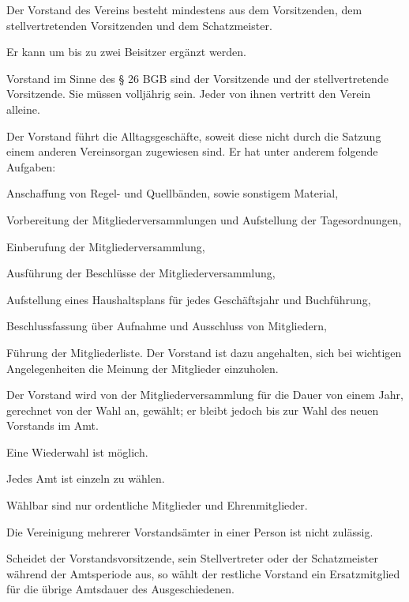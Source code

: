 \begin{contract}
	
 Der Vorstand des Vereins besteht mindestens aus dem Vorsitzenden, dem stellvertretenden Vorsitzenden und dem Schatzmeister.

	Er kann um bis zu zwei Beisitzer ergänzt werden.
	
	 Vorstand im Sinne des § 26 BGB sind der Vorsitzende und der stellvertretende Vorsitzende. Sie müssen volljährig sein. Jeder von ihnen vertritt den Verein alleine.

	
Der Vorstand führt die Alltagsgeschäfte, soweit diese nicht durch die Satzung einem anderen Vereinsorgan zugewiesen sind. Er hat unter anderem folgende Aufgaben:
	\begin{subpara}
		\item Anschaffung von Regel- und Quellbänden, sowie sonstigem Material,
		\item Vorbereitung der Mitgliederversammlungen und Aufstellung der Tagesordnungen,
		\item Einberufung der Mitgliederversammlung,
		\item Ausführung der Beschlüsse der Mitgliederversammlung,
		\item Aufstellung eines Haushaltsplans für jedes Geschäftsjahr und Buchführung,
		\item Beschlussfassung über Aufnahme und Ausschluss von Mitgliedern,
		\item Führung der Mitgliederliste.
		Der Vorstand ist dazu angehalten, sich bei wichtigen Angelegenheiten die Meinung der Mitglieder einzuholen.
	\end{subpara}

	
 Der Vorstand wird von der Mitgliederversammlung für die Dauer von einem Jahr, gerechnet von der Wahl an, gewählt; er bleibt jedoch bis zur Wahl des neuen Vorstands im Amt. 
	
 Eine Wiederwahl ist möglich.
	
 Jedes Amt ist einzeln zu wählen.
	
 Wählbar sind nur ordentliche Mitglieder und Ehrenmitglieder.
	
 Die Vereinigung mehrerer Vorstandsämter in einer Person ist nicht zulässig.
	
 Scheidet der Vorstandsvorsitzende, sein Stellvertreter oder der Schatzmeister während der Amtsperiode aus, so wählt der restliche Vorstand ein Ersatzmitglied für die übrige Amtsdauer des Ausgeschiedenen.


\end{contract}
